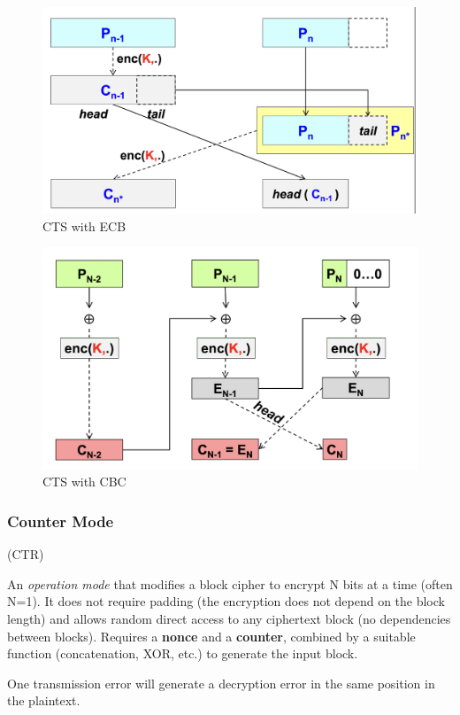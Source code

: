 \begin{multicols}{2}

    \begin{figure}[H]
        \centering
        \includegraphics[width=\linewidth]{Images/Cryptography/CTS_ECB.png}
        \caption{CTS with ECB}
    \end{figure}

    \columnbreak

    \begin{figure}[H]
        \centering
        \includegraphics[width=\linewidth]{Images/Cryptography/CTS_CBC.png}
        \caption{CTS with CBC}
    \end{figure}
    
\end{multicols}

\subsubsection{Counter Mode}
\begin{center}
    (CTR)
\end{center}
An \textit{operation mode} that modifies a block cipher to encrypt N bits at a time (often N=1). It does not require padding (the encryption does not depend on the block length) and allows random direct access to any ciphertext block (no dependencies between blocks). Requires a \textbf{nonce} and a \textbf{counter}, combined by a suitable function (concatenation, XOR, etc.) to generate the input block.
\begin{tcolorbox}[colback=red!10!white, colframe=red!70!black, coltitle=white, title=Beware]
One transmission error will generate a decryption error in the same position in the plaintext.
\end{tcolorbox}

